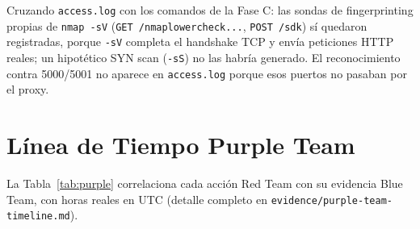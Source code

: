 \documentclass[journal]{IEEEtran}
\begin{document}
Cruzando \texttt{access.log} con los comandos de la Fase C: las sondas de
fingerprinting propias de \texttt{nmap -sV} (\texttt{GET
/nmaplowercheck...}, \texttt{POST /sdk}) sí quedaron registradas, porque
\texttt{-sV} completa el handshake TCP y envía peticiones HTTP reales; un
hipotético SYN scan (\texttt{-sS}) no las habría generado. El reconocimiento
contra 5000/5001 no aparece en \texttt{access.log} porque esos puertos no
pasaban por el proxy.

\section{Línea de Tiempo Purple Team}
\label{sec:purpleteam}

La Tabla~\ref{tab:purple} correlaciona cada acción Red Team con su evidencia
Blue Team, con horas reales en UTC (detalle completo en
\texttt{evidence/purple-team-timeline.md}).
\end{document}
